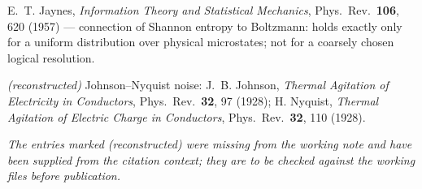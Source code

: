 \begin{description}[leftmargin=3.2em,style=sameline,itemsep=0.3em]
\item[{[B19]}] E.~T. Jaynes, \emph{Information Theory and Statistical Mechanics},
Phys.\ Rev.\ \textbf{106}, 620 (1957) --- connection of Shannon entropy to
Boltzmann: holds exactly only for a uniform distribution over physical
microstates; not for a coarsely chosen logical resolution.

\item[{[B20]}] \emph{(reconstructed)} Johnson--Nyquist noise: J.~B. Johnson,
\emph{Thermal Agitation of Electricity in Conductors}, Phys.\ Rev.\ \textbf{32},
97 (1928); H. Nyquist, \emph{Thermal Agitation of Electric Charge in Conductors},
Phys.\ Rev.\ \textbf{32}, 110 (1928).

\end{description}
\endgroup

\vspace{1em}
\noindent
{\small\itshape The entries marked \emph{(reconstructed)} were missing from the
working note and have been supplied from the citation context; they are to be
checked against the working files before publication.}
